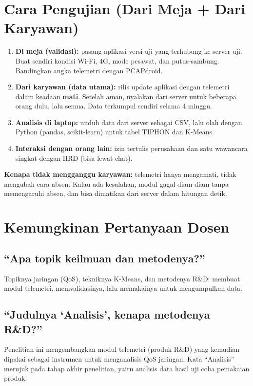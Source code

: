 \documentclass[11pt,a4paper]{article}
\begin{document}
\section{Cara Pengujian (Dari Meja + Dari Karyawan)}
\begin{enumerate}
\item \textbf{Di meja (validasi):} pasang aplikasi versi uji yang terhubung ke server uji. Buat sendiri kondisi Wi-Fi, 4G, mode pesawat, dan putus-sambung. Bandingkan angka telemetri dengan PCAPdroid.
\item \textbf{Dari karyawan (data utama):} rilis update aplikasi dengan telemetri dalam keadaan \textbf{mati}. Setelah aman, nyalakan dari server untuk beberapa orang dulu, lalu semua. Data terkumpul sendiri selama 4 minggu.
\item \textbf{Analisis di laptop:} unduh data dari server sebagai CSV, lalu olah dengan Python (pandas, scikit-learn) untuk tabel TIPHON dan K-Means.
\item \textbf{Interaksi dengan orang lain:} izin tertulis perusahaan dan satu wawancara singkat dengan HRD (bisa lewat chat).
\end{enumerate}
\textbf{Kenapa tidak mengganggu karyawan:} telemetri hanya mengamati, tidak mengubah cara absen. Kalau ada kesalahan, modul gagal diam-diam tanpa memengaruhi absen, dan bisa dimatikan dari server dalam hitungan detik.

\section{Kemungkinan Pertanyaan Dosen}
\subsection{``Apa topik keilmuan dan metodenya?''}
Topiknya jaringan (QoS), tekniknya K-Means, dan metodenya R\&D: membuat modul telemetri, memvalidasinya, lalu memakainya untuk mengumpulkan data.

\subsection{``Judulnya `Analisis', kenapa metodenya R\&D?''}
Penelitian ini mengembangkan modul telemetri (produk R\&D) yang kemudian dipakai sebagai instrumen untuk menganalisis QoS jaringan. Kata ``Analisis'' merujuk pada tahap akhir penelitian, yaitu analisis data hasil uji coba pemakaian produk.
\end{document}
